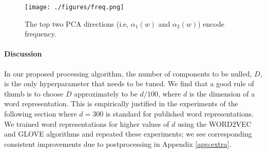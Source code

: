 \documentclass{article} \usepackage{acl2017,times}
\begin{document}
\begin{figure*}[!h]
  \centering
  \vspace{-10pt}
  \texttt{[image: ./figures/freq.png]}
  \vspace{-20pt}
  \caption{The top two PCA directions (i.e, $\alpha_1(w)$ and $\alpha_2(w)$) encode   frequency.}
  \vspace{-10pt}
  \label{fig:frequency}
\end{figure*}

\paragraph{Discussion} In our proposed processing algorithm, the number of components to be nulled,  $D$, is the only hyperparameter that needs to be tuned. We find that a good rule of thumb is to choose $D$ approximately to be $d/100$, where $d$ is the dimension of a word representation. This is empirically justified in the experiments of the following  section where $d=300$ is standard for published word representations. We trained word representations for higher  values of $d$ using the WORD2VEC and GLOVE algorithms and  
 repeated these experiments; we see corresponding consistent improvements due to postprocessing in   Appendix \ref{app:extra}.
\end{document}

